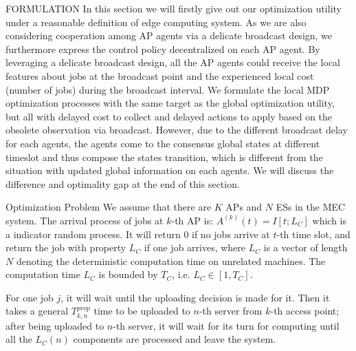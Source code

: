 \documentclass[10pt, conference, letterpaper]{IEEEtran}
\begin{document}
    \begin{section}{FORMULATION}
        \label{sec:formulation}
        In this section we will firstly give out our optimization utility under a reasonable definition of edge computing system. As we are also considering cooperation among AP agents via a delicate broadcast design, we furthermore express the control policy decentralized on each AP agent.
        By leveraging a delicate broadcast design, all the AP agents could receive the local features about jobs at the broadcast point and the experienced local cost (number of jobs) during the broadcast interval.
        We formulate the local MDP optimization processes with the same target as the global optimization utility, but all with delayed cost to collect and delayed actions to apply based on the obsolete observation via broadcast. However, due to the different broadcast delay for each agents, the agents come to the consensus global states at different timeslot and thus compose the states transition, which is different from the situation with updated global information on each agents. We will discuss the difference and optimality gap at the end of this section.

        \begin{subsection}{Optimization Problem}
            We assume that there are $K$ APs and $N$ ESs in the MEC system.
            The arrival process of jobs at $k$-th AP is: $A^{(k)}(t)=I[t; L_C]$ which is a indicator random process. It will return $0$ if no jobs arrive at $t$-th time slot, and return the job with property $L_C$ if one job arrives, where $L_C$ is a vector of length $N$ denoting the deterministic computation time on unrelated machines.
            The computation time $L_C$ is bounded by $T_C$, i.e. $L_C \in [1,T_C]$.
                
            For one job $j$, it will wait until the uploading decision is made for it. Then it takes a general $T^{prop}_{k,n}$ time to be uploaded to $n$-th server from $k$-th access point; after being uploaded to $n$-th server, it will wait for its turn for computing until all the $L_C(n)$ components are processed and leave the system.
                

\end{subsection}
\end{section}
\end{document}
